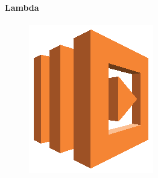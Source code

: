 \documentclass[
12pt,
english,
ngerman,
headsepline,
twoside,
openright,
numbers=noenddot,version=first
]{scrreprt}
\begin{document}
\paragraph{Lambda}
\begin{figure}
	\includegraphics[width=0.9\linewidth]{./pics/aws/Compute_AWSLambda.eps}
\end{figure}
\end{document}
